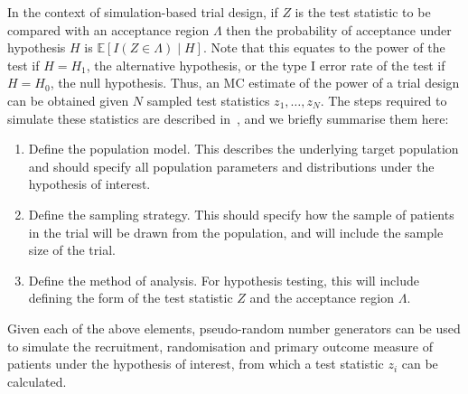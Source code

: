 \documentclass{article} %
\begin{document}
In the context of simulation-based trial design, if $Z$ is the test statistic to be compared with an acceptance region $\Lambda$ then the probability of acceptance under hypothesis $H$ is $\mathbb{E}[I(Z \in \Lambda) \mid H]$. Note that this equates to the power of the test if $H = H_{1}$, the alternative hypothesis, or the type I error rate of the test if $H = H_{0}$, the null hypothesis. Thus, an MC estimate of the power of a trial design can be obtained given $N$ sampled test statistics $z_{1}, \ldots , z_{N}$. The steps required to simulate these statistics are described in~\cite{Landau2013}, and we briefly summarise them here:
\begin{enumerate}
\item Define the population model. This describes the underlying target population and should specify all population parameters and distributions under the hypothesis of interest.
\item Define the sampling strategy. This should specify how the sample of patients in the trial will be drawn from the population, and will include the sample size of the trial.
\item Define the method of analysis. For hypothesis testing, this will include defining the form of the test statistic $Z$ and the acceptance region $\Lambda$.
\end{enumerate}
Given each of the above elements, pseudo-random number generators can be used to simulate the recruitment, randomisation and primary outcome measure of patients under the hypothesis of interest, from which a test statistic $z_{i}$ can be calculated. 

\end{document}

